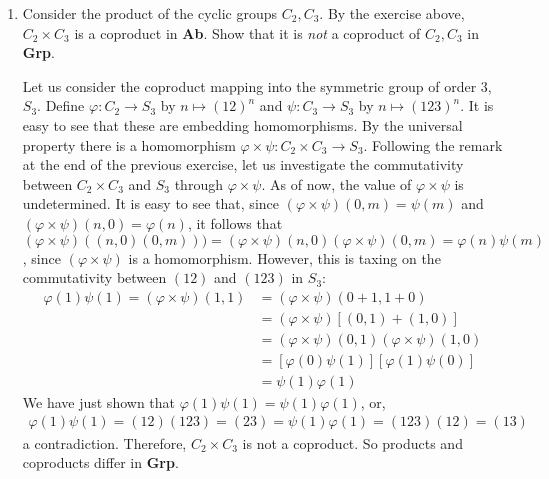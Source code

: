 \documentclass[12pt]{article}
\begin{document}
\begin{enumerate}
\item Consider the product of the cyclic groups $ C_2, C_3 $. By the exercise above, $ C_2 \times C_3 $ is a coproduct in \textbf{Ab}. Show that it is \textit{not} a coproduct of $ C_2, C_3 $ in \textbf{Grp}.

\begin{solution}
Let us consider the coproduct mapping into the symmetric group of order $ 3 $, $ S_3 $. Define $ \varphi : C_2 \to S_3$ by $ n \mapsto (1 2)^n$ and $ \psi : C_3 \to S_3 $ by $ n \mapsto (1 2 3)^n $. It is easy to see that these are embedding homomorphisms. By the universal property there is a homomorphism $ \varphi \times \psi : C_2 \times C_3 \to S_3 $. Following the remark at the end of the previous exercise, let us investigate the commutativity between $ C_2 \times C_3 $ and $ S_3 $ through $ \varphi \times \psi $. As of now, the value of $ \varphi \times \psi $ is undetermined. It is easy to see that, since $ (\varphi \times \psi)(0, m) = \psi(m) $ and $ (\varphi \times \psi)(n, 0) = \varphi(n) $, it follows that $ (\varphi \times \psi)((n, 0) (0, m))) = (\varphi \times \psi)(n, 0) (\varphi \times \psi)(0, m) = \varphi(n) \psi(m) $, since $ (\varphi \times \psi) $ is a homomorphism. However, this is taxing on the commutativity between $ (1 2) $ and $ (123) $ in $ S_3 $:
\begin{align*}
	\varphi(1) \psi(1) = (\varphi \times \psi)(1, 1) &= (\varphi \times \psi)(0 + 1, 1 + 0)\\
	&= (\varphi \times \psi)[(0, 1) + (1, 0)]\\
	&= (\varphi \times \psi)(0, 1) (\varphi \times \psi)(1, 0)\\
	&= [\varphi(0) \psi(1)] [\varphi(1) \psi(0)]\\
	&= \psi(1) \varphi(1)
\end{align*}
We have just shown that $ \varphi(1) \psi(1) = \psi(1) \varphi(1) $, or,
\begin{align*}
	\varphi(1) \psi(1) = (1 2) (1 2 3) = (2 3) =  \psi(1) \varphi(1) = (1 2 3) (1 2) = (1 3)
\end{align*}
a contradiction. Therefore, $ C_2 \times C_3 $ is not a coproduct. So products and coproducts differ in \textbf{Grp}.
\end{solution}

\end{enumerate}
\end{document}
